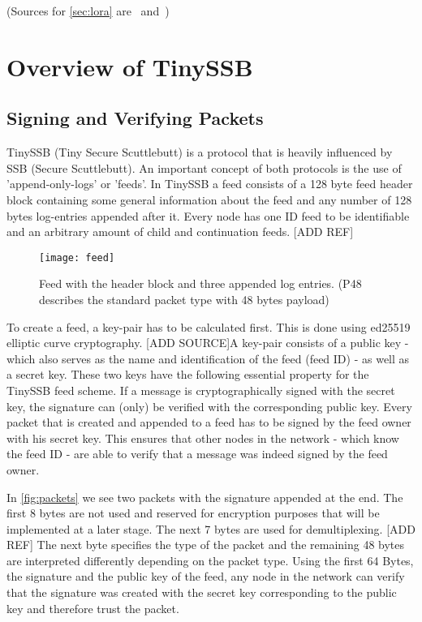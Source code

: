 (Sources for \cref{sec:lora} are~\cite{10.1007/978-3-030-01168-0_11} and~\cite{10.1145/3293534})

\section{Overview of TinySSB}
\subsection{Signing and Verifying Packets}
\label{sec:signing}
TinySSB (Tiny Secure Scuttlebutt) is a protocol that is heavily influenced by SSB (Secure Scuttlebutt). An important concept of both protocols is the use of 'append-only-logs' or 'feeds'. In TinySSB a feed consists of a 128 byte feed header block containing some general information about the feed and any number of 128 bytes log-entries appended after it. Every node has one ID feed to be identifiable and an arbitrary amount of child and continuation feeds. [ADD REF]
\begin{figure}
\centering
\texttt{[image: feed]}
\caption{Feed with the header block and three appended log entries. (P48 describes the standard packet type with 48 bytes payload)}
\label{fig:feed}
\end{figure}

To create a feed, a key-pair has to be calculated first. This is done using ed25519 elliptic curve cryptography. [ADD SOURCE]A key-pair consists of a public key - which also serves as the name and identification of the feed (feed ID) - as well as a secret key. These two keys have the following essential property for the TinySSB feed scheme. If a message is cryptographically signed with the secret key, the signature can (only) be verified with the corresponding public key. Every packet that is created and appended to a feed has to be signed by the feed owner with his secret key. This ensures that other nodes in the network - which know the feed ID - are able to verify that a message was indeed signed by the feed owner.

In \cref{fig:packets} we see two packets with the signature appended at the end. The first 8 bytes are not used and reserved for encryption purposes that will be implemented at a later stage. The next 7 bytes are used for demultiplexing. [ADD REF] The next byte specifies the type of the packet and the remaining 48 bytes are interpreted differently depending on the packet type. Using the first 64 Bytes, the signature and the public key of the feed, any node in the network can verify that the signature was created with the secret key corresponding to the public key and therefore trust the packet.\\

